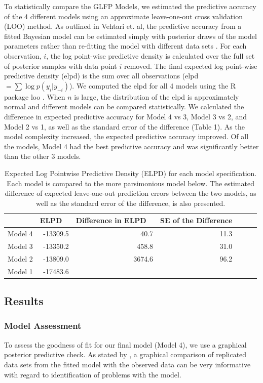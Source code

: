 \documentclass[12pt]{article}
\begin{document}
To statistically compare the GLFP Models, we estimated the predictive accuracy of the 4 different models using an approximate leave-one-out cross validation (LOO) method.  As outlined in Vehtari et. al, the predictive accuracy from a fitted Bayesian model can be estimated simply with posterior draws of the model parameters rather than re-fitting the model with different data sets \cite{vehtari}.  For each observation, $i$, the log point-wise predictive density is calculated over the full set of posterior samples with data point $i$ removed.  The final expected log point-wise predictive density (elpd) is the sum over all observations (elpd $=\sum{\log p(y_i|y_{-i})}$).  We computed the elpd for all 4 models using the R package loo \cite{loo}.  When $n$ is large, the distribution of the elpd is approximately normal and different models can be compared statistically.  We calculated the difference in expected predictive accuracy for Model 4 vs 3, Model 3 vs 2, and Model 2 vs 1, as well as the standard error of the difference (Table 1).  As the model complexity increased, the expected predictive accuracy improved.  Of all the models, Model 4 had the best predictive accuracy and was significantly better than the other 3 models.

\begin{table}[H]
\centering
\begin{tabular}{rrrrrrr}
  \hline
 & ELPD \ & Difference in ELPD \ & SE of the Difference \\ 
  \hline
Model 4 & -13309.5 & 40.7 & 11.3 \\ 
Model 3 & -13350.2 & 458.8 & 31.0  \\ 
Model 2 & -13809.0 & 3674.6 & 96.2 \\ 
Model 1 & -17483.6  \\ 
   \hline
\end{tabular}
\caption{Expected Log Pointwise Predictive Density (ELPD) for each model specification.  Each model is compared to the more parsimonious model below.  The estimated difference of expected leave-one-out prediction errors between the two models, as well as the standard error of the difference, is also presented.}
\label{table:1}
\end{table}

\subsection{Results}
\subsubsection{Model Assessment}
To assess the goodness of fit for our final model (Model 4), we use a graphical posterior predictive check. As stated by \citet{gelman1996postpred}, a graphical comparison of replicated data sets from the fitted model with the observed data can be very informative with regard to identification of problems with the model.
\end{document}

